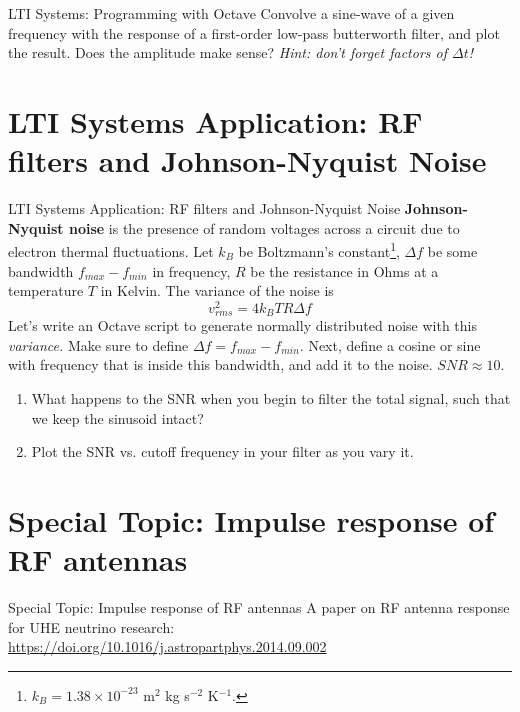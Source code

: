 \documentclass{beamer}
\begin{document}
\begin{frame}[fragile]{LTI Systems: Programming with Octave}
\small
Convolve a sine-wave of a given frequency with the response of a first-order low-pass butterworth filter, and plot the result.  Does the amplitude make sense? \textit{Hint: don't forget factors of $\Delta t$!}
\end{frame}

\section{LTI Systems Application: RF filters and Johnson-Nyquist Noise}

\begin{frame}[fragile]{LTI Systems Application: RF filters and Johnson-Nyquist Noise}
\small
\textbf{Johnson-Nyquist noise} is the presence of random voltages across a circuit due to electron thermal fluctuations. Let $k_B$ be Boltzmann's constant\footnote{$k_B = 1.38 \times 10^{-23}$ m$^2$ kg s$^{-2}$ K$^{-1}$.}, $\Delta f$ be some bandwidth $f_{max} - f_{min}$ in frequency, $R$ be the resistance in Ohms at a temperature $T$ in Kelvin. The variance of the noise is
\begin{equation}
v^2_{rms} = 4 k_B T R \Delta f
\end{equation}
Let's write an Octave script to generate normally distributed noise with this \textit{variance.}  Make sure to define $\Delta f = f_{max} - f_{min}$.  Next, define a cosine or sine with frequency that is inside this bandwidth, and add it to the noise.  $SNR \approx 10$.
\begin{enumerate}
\item What happens to the SNR when you begin to filter the total signal, such that we keep the sinusoid intact?
\item Plot the SNR vs. cutoff frequency in your filter as you vary it.
\end{enumerate}
\end{frame}

\section{Special Topic: Impulse response of RF antennas}

\begin{frame}{Special Topic: Impulse response of RF antennas}
\small
A paper on RF antenna response for UHE neutrino research: \\ \url{https://doi.org/10.1016/j.astropartphys.2014.09.002}
\end{frame}
\end{document}

